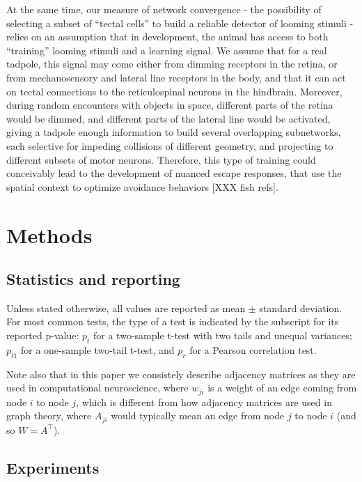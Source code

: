 \documentclass{article}
\begin{document}
At the same time, our measure of network convergence - the possibility of selecting a subset of “tectal cells” to build a reliable detector of looming stimuli - relies on an assumption that in development, the animal has access to both “training” looming stimuli and a learning signal. We assume that for a real tadpole, this signal may come either from dimming receptors in the retina, or from mechanosensory and lateral line receptors in the body, and that it can act on tectal connections to the reticulospinal neurons in the hindbrain. Moreover, during random encounters with objects in space, different parts of the retina would be dimmed, and different parts of the lateral line would be activated, giving a tadpole enough information to build several overlapping subnetworks, each selective for impeding collisions of different geometry, and projecting to different subsets of motor neurons. Therefore, this type of training could conceivably lead to the development of nuanced escape responses, that use the spatial context to optimize avoidance behaviors \citep{khakhalin2014}[XXX fish refs].

\section*{Methods}

\subsection*{Statistics and reporting}

Unless stated otherwise, all values are reported as mean $\pm$ standard deviation. For most common tests, the type of a test is indicated by the subscript for its reported p-value: $p_t$ for a two-sample t-test with two tails and unequal variances; $p_{t1}$ for a one-sample two-tail t-test, and $p_r$ for a Pearson correlation test.

Note also that in this paper we consistely describe adjacency matrices as they are used in computational neuroscience, where $w_{ji}$ is a weight of an edge coming from node $i$ to node $j$, which is different from how adjacency matrices are used in graph theory, where $A_{ji}$ would typically mean an edge from node $j$ to node $i$ (and so $W = A^\top$).

\subsection*{Experiments}
\end{document}
